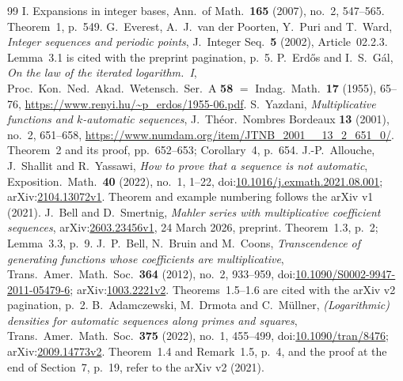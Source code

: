 \begin{thebibliography}{99}
{I. Expansions in integer bases}, Ann.\ of Math.\ \textbf{165} (2007), no.~2,
547--565. Theorem~1, p.~549.
G.~Everest, A.~J.~van der Poorten, Y.~Puri and T.~Ward, \emph{Integer
sequences and periodic points}, J.\ Integer Seq.\ \textbf{5} (2002),
Article~02.2.3. Lemma~3.1 is cited with the preprint pagination, p.~5.
P.~Erd\H{o}s and I.~S.~G\'al, \emph{On the law of the iterated logarithm.~I},
Proc.\ Kon.\ Ned.\ Akad.\ Wetensch.\ Ser.~A \textbf{58} $=$ Indag.\ Math.\
\textbf{17} (1955), 65--76, \url{https://www.renyi.hu/~p_erdos/1955-06.pdf}.
\bibitem{yazdani2001} S.~Yazdani,
\emph{Multiplicative functions and $k$-automatic sequences},
J.\ Th\'eor.\ Nombres Bordeaux \textbf{13} (2001), no.~2, 651--658,
\url{https://www.numdam.org/item/JTNB_2001__13_2_651_0/}.
Theorem~2 and its proof, pp.~652--653; Corollary~4, p.~654.
 J.-P.~Allouche, J.~Shallit and R.~Yassawi,
\emph{How to prove that a sequence is not automatic},
Exposition.\ Math.\ \textbf{40} (2022), no.~1, 1--22,
doi:\href{https://doi.org/10.1016/j.exmath.2021.08.001}{10.1016/j.exmath.2021.08.001};
arXiv:\href{https://arxiv.org/abs/2104.13072v1}{2104.13072v1}.
Theorem and example numbering follows the arXiv v1 (2021).
 J.~Bell and D.~Smertnig,
\emph{Mahler series with multiplicative coefficient sequences},
arXiv:\href{https://arxiv.org/abs/2603.23456v1}{2603.23456v1},
24 March 2026, preprint. Theorem~1.3, p.~2; Lemma~3.3, p.~9.
 J.~P.~Bell, N.~Bruin and M.~Coons,
\emph{Transcendence of generating functions whose coefficients are multiplicative},
Trans.\ Amer.\ Math.\ Soc.\ \textbf{364} (2012), no.~2, 933--959,
doi:\href{https://doi.org/10.1090/S0002-9947-2011-05479-6}{10.1090/S0002-9947-2011-05479-6};
arXiv:\href{https://arxiv.org/abs/1003.2221v2}{1003.2221v2}.
Theorems~1.5--1.6 are cited with the arXiv v2 pagination, p.~2.
 B.~Adamczewski, M.~Drmota and C.~M\"ullner,
\emph{(Logarithmic) densities for automatic sequences along primes and squares},
Trans.\ Amer.\ Math.\ Soc.\ \textbf{375} (2022), no.~1, 455--499,
doi:\href{https://doi.org/10.1090/tran/8476}{10.1090/tran/8476};
arXiv:\href{https://arxiv.org/abs/2009.14773v2}{2009.14773v2}.
Theorem~1.4 and Remark~1.5, p.~4, and the proof at the end of Section~7,
p.~19, refer to the arXiv v2 (2021).
\end{thebibliography}


